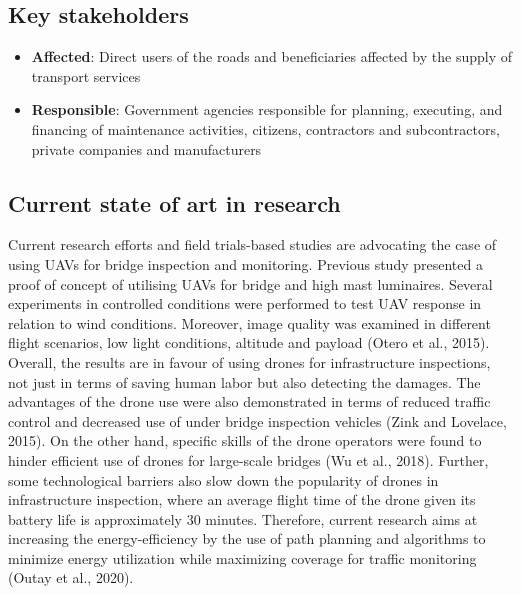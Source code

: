 \documentclass[
]{book}
\providecommand{\tightlist}{%
  \setlength{\itemsep}{0pt}\setlength{\parskip}{0pt}}
\begin{document}
\hypertarget{key-stakeholders-6}{%
\subsection*{Key stakeholders}\label{key-stakeholders-6}}

\begin{itemize}
\tightlist
\item
  \textbf{Affected}: Direct users of the roads and beneficiaries affected by the supply of transport services
\item
  \textbf{Responsible}: Government agencies responsible for planning, executing, and financing of maintenance activities, citizens, contractors and subcontractors, private companies and manufacturers
\end{itemize}

\hypertarget{current-state-of-art-in-research-6}{%
\subsection*{Current state of art in research}\label{current-state-of-art-in-research-6}}

Current research efforts and field trials-based studies are advocating the case of using UAVs for bridge inspection and monitoring. Previous study presented a proof of concept of utilising UAVs for bridge and high mast luminaires. Several experiments in controlled conditions were performed to test UAV response in relation to wind conditions. Moreover, image quality was examined in different flight scenarios, low light conditions, altitude and payload (Otero et al., 2015). Overall, the results are in favour of using drones for infrastructure inspections, not just in terms of saving human labor but also detecting the damages. The advantages of the drone use were also demonstrated in terms of reduced traffic control and decreased use of under bridge inspection vehicles (Zink and Lovelace, 2015). On the other hand, specific skills of the drone operators were found to hinder efficient use of drones for large-scale bridges (Wu et al., 2018). Further, some technological barriers also slow down the popularity of drones in infrastructure inspection, where an average flight time of the drone given its battery life is approximately 30 minutes. Therefore, current research aims at increasing the energy-efficiency by the use of path planning and algorithms to minimize energy utilization while maximizing coverage for traffic monitoring (Outay et al., 2020).
\end{document}
